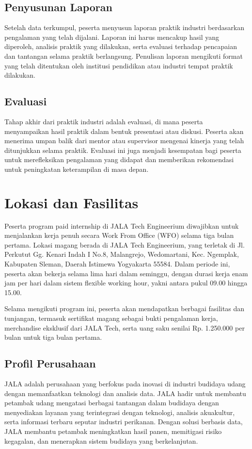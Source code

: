 \subsection{Penyusunan Laporan}
Setelah data terkumpul, peserta menyusun laporan praktik industri berdasarkan pengalaman yang telah dijalani. Laporan ini harus mencakup hasil yang diperoleh, analisis praktik yang dilakukan, serta evaluasi terhadap pencapaian dan tantangan selama praktik berlangsung. Penulisan laporan mengikuti format yang telah ditentukan oleh institusi pendidikan atau industri tempat praktik dilakukan.

\subsection{Evaluasi}
Tahap akhir dari praktik industri adalah evaluasi, di mana peserta menyampaikan hasil praktik dalam bentuk presentasi atau diskusi. Peserta akan menerima umpan balik dari mentor atau supervisor mengenai kinerja yang telah ditunjukkan selama praktik. Evaluasi ini juga menjadi kesempatan bagi peserta untuk merefleksikan pengalaman yang didapat dan memberikan rekomendasi untuk peningkatan keterampilan di masa depan.

\section{Lokasi dan Fasilitas}
Peserta program paid internship di JALA Tech Engineerium diwajibkan untuk menjalankan kerja penuh secara Work From Office (WFO) selama tiga bulan pertama. Lokasi magang berada di JALA Tech Engineerium, yang terletak di Jl. Perkutut Gg. Kenari Indah I No.8, Malangrejo, Wedomartani, Kec. Ngemplak, Kabupaten Sleman, Daerah Istimewa Yogyakarta 55584. Dalam periode ini, peserta akan bekerja selama lima hari dalam seminggu, dengan durasi kerja enam jam per hari dalam sistem flexible working hour, yakni antara pukul 09.00 hingga 15.00.

Selama mengikuti program ini, peserta akan mendapatkan berbagai fasilitas dan tunjangan, termasuk sertifikat magang sebagai bukti pengalaman kerja, merchandise eksklusif dari JALA Tech, serta uang saku senilai Rp. 1.250.000 per bulan untuk tiga bulan pertama.

\subsection{Profil Perusahaan \perusahaan}
JALA adalah perusahaan yang berfokus pada inovasi di industri budidaya udang dengan memanfaatkan teknologi dan analisis data. JALA hadir untuk membantu petambak udang mengatasi berbagai tantangan dalam budidaya dengan menyediakan layanan yang terintegrasi dengan teknologi, analisis akuakultur, serta informasi terbaru seputar industri perikanan. Dengan solusi berbasis data, JALA membantu petambak meningkatkan hasil panen, memitigasi risiko kegagalan, dan menerapkan sistem budidaya yang berkelanjutan.

